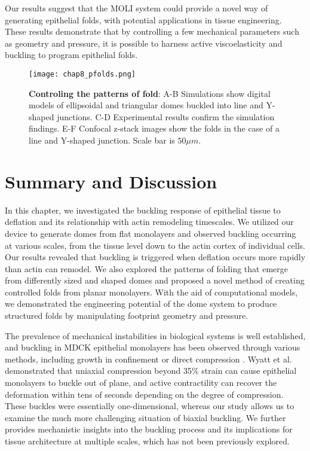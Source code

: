 Our results suggest that the MOLI system could provide a novel way of generating epithelial folds, with potential applications in tissue engineering. These results demonstrate that by controlling a few mechanical parameters such as geometry and pressure, it is possible to harness active viscoelasticity and  buckling to program epithelial folds.

\begin{figure}[h!]
	\centering
	\texttt{[image: chap8\_pfolds.png]}
	\caption{\label{fig_8_7} \textbf{Controling the patterns of fold}: A-B Simulations show digital models of ellipsoidal and triangular domes buckled into line and Y-shaped junctions. C-D Experimental results confirm the simulation findings. E-F Confocal z-stack images show the folds in the case of a line and Y-shaped junction. Scale bar is $50\mu m$.	}
\end{figure}



\hypertarget{summary-and-discussion-1}{%
	\section{Summary and Discussion}\label{summary-and-discussion-1}}

In this chapter, we investigated the buckling response of epithelial tissue to deflation and its relationship with actin remodeling timescales. We utilized our device to generate domes from flat monolayers and observed buckling occurring at various scales, from the tissue level down to the actin cortex of individual cells. Our results revealed that buckling is triggered when deflation occurs more rapidly than actin can remodel. We also explored the patterns of folding that emerge from differently sized and shaped domes and proposed a novel method of creating controlled folds from planar monolayers. With the aid of computational models, we demonstrated the engineering potential of the dome system to produce structured folds by manipulating footprint geometry and pressure.

The prevalence of mechanical instabilities in biological systems is well established, and buckling in MDCK epithelial monolayers has been observed through various methods, including growth in confinement or direct compression \cite{wyatt2020,trushko2020}. Wyatt et al. demonstrated that uniaxial compression beyond 35\% strain can cause epithelial monolayers to buckle out of plane, and active contractility can recover the deformation within tens of seconds depending on the degree of compression. These buckles were essentially one-dimensional, whereas our study allows us to examine the much more challenging situation of biaxial buckling. We further provides mechanistic insights into the buckling process and its implications for tissue architecture at multiple scales, which has not been previously explored. 

